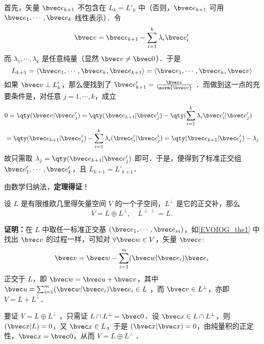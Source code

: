 首先，矢量 $\bvec e_{k+1}$ 不包含在 $L_k=L'_k$ 中（否则，$\bvec e_{k+1}$ 可用 $\bvec e_1,\cdots,\bvec e_k$ 线性表示）．令
\begin{equation}
\bvec v=\bvec e_{k+1}-\sum_{i=1}^{k}\lambda_i\bvec e'_i
\end{equation}
而 $\lambda_1,\cdots,\lambda_k$ 是任意纯量（显然 $\bvec v\neq\bvec 0$）．于是
\begin{equation}
L_{k+1}=\langle\bvec e_1,\cdots,\bvec e_k,\bvec e_{k+1}\rangle=\langle\bvec e_1,\cdots,\bvec e_k,\bvec v\rangle
\end{equation}
如果 $\bvec v\perp L'_k$，那么便找到了 $\bvec e'_{k+1}=\frac{\bvec v}{\norm{\bvec v}}$ ．而做到这一点的充要条件是，对任意 $j=1,\cdots,k$，成立
\begin{equation}
\begin{aligned}
&0=\qty(\bvec v|\bvec e'_j)=\qty(\bvec e_{k+1}|\bvec e'_j)-\qty(\sum_{i=1}^k\lambda_i\bvec e'_i|\bvec e'_j)\\
&=\qty(\bvec e_{k+1}|\bvec e'_j)-\sum_{i=1}^k\lambda_i(\bvec e'_i|\bvec e'_j)=\qty(\bvec e_{k+1}|\bvec e'_j)-\lambda_j
\end{aligned}
\end{equation}
故只需取 $\lambda_j=\qty(\bvec e_{k+1}|\bvec e'_j)$ 即可．于是，便得到了标准正交组 $\bvec e'_1,\cdots,\bvec e'_k$，且 $L_{k+1}=L'_{k+1}$．

由数学归纳法，\textbf{定理得证}！

\begin{theorem}{}\label{EVOIOG_the2}
设 $L$ 是有限维欧几里得矢量空间 $V$ 的一个子空间，$L^{\perp}$ 是它的正交补，那么
\begin{equation}
V=L\oplus L^{\perp},\quad L^{\perp\perp}=L.
\end{equation}
\end{theorem}
\textbf{证明：}在 $L$ 中取任一标准正交基 $(\bvec e_1,\cdots,\bvec e_m)$，如\autoref{EVOIOG_the1} 中找出 $\bvec v$ 的过程一样，可知对 $\forall \bvec w\in V$，矢量 $\bvec v$:
\begin{equation}
\bvec v=\bvec w-\sum_{i=1}^m(\bvec w|\bvec e_i)\bvec e_i
\end{equation}
正交于 $L$，即 $\bvec w=\bvec u+\bvec v$，其中 $\bvec u=\sum_{i=1}^m(\bvec w|\bvec e_i)\bvec e_i\in L$ ，而 $\bvec v\in L^{\perp}$，亦即 $V=L+L^{\perp}$．

要证 $V=L\oplus L^{\perp}$ ，只需证 $L\cap L^{\perp}=\bvec 0$．设 $\bvec x\in L\cap L^{\perp}$，则 $(\bvec x|L)=0$，又 $\bvec x\in L$，于是 $(\bvec x|\bvec x)=0$，由纯量积的正定性，$\bvec x=\bvec 0$，从而 $V=L\oplus L^{\perp}$ ．

